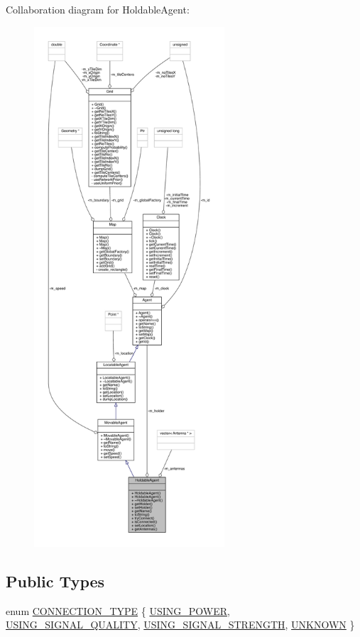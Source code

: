 Collaboration diagram for Holdable\+Agent\+:
\nopagebreak
\begin{figure}[H]
\begin{center}
\leavevmode
\includegraphics[height=550pt]{class_holdable_agent__coll__graph}
\end{center}
\end{figure}
\subsection*{Public Types}
\begin{DoxyCompactItemize}
\item 
enum \mbox{\hyperlink{class_holdable_agent_ae2c334b004d7b9c5a999cf2618e4e518}{C\+O\+N\+N\+E\+C\+T\+I\+O\+N\+\_\+\+T\+Y\+PE}} \{ \mbox{\hyperlink{class_holdable_agent_ae2c334b004d7b9c5a999cf2618e4e518ab8f4a3956d88a54e0aad08e89e203fd6}{U\+S\+I\+N\+G\+\_\+\+P\+O\+W\+ER}}, 
\mbox{\hyperlink{class_holdable_agent_ae2c334b004d7b9c5a999cf2618e4e518a93c5b260edf949c65b96fec443c33f2b}{U\+S\+I\+N\+G\+\_\+\+S\+I\+G\+N\+A\+L\+\_\+\+Q\+U\+A\+L\+I\+TY}}, 
\mbox{\hyperlink{class_holdable_agent_ae2c334b004d7b9c5a999cf2618e4e518ac0a762a4e8fa38dd6285f84aefadd3f4}{U\+S\+I\+N\+G\+\_\+\+S\+I\+G\+N\+A\+L\+\_\+\+S\+T\+R\+E\+N\+G\+TH}}, 
\mbox{\hyperlink{class_holdable_agent_ae2c334b004d7b9c5a999cf2618e4e518a6bdb1529a2032a4648226328e179f552}{U\+N\+K\+N\+O\+WN}}
 \}
\end{DoxyCompactItemize}
